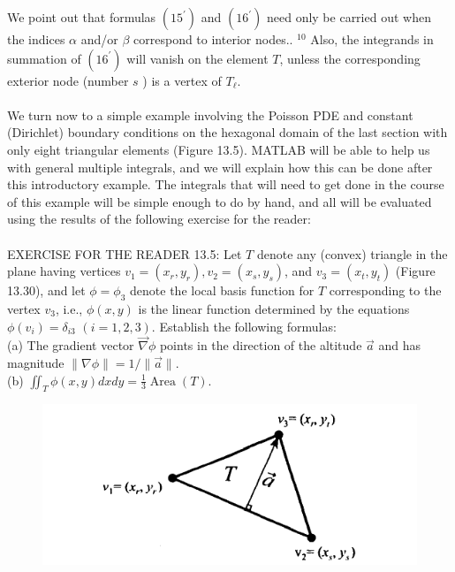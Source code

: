 \documentclass[../main.tex]{subfiles}
\begin{document}
We point out that formulas $\left(15^{\prime}\right)$ and $\left(16^{\prime}\right)$ need only be carried out when the indices $\alpha$ and/or $\beta$ correspond to interior nodes.. ${ }^{10}$ Also, the integrands in summation of $\left(16^{\prime}\right)$ will vanish on the element $T$, unless the corresponding exterior node (number $s$ ) is a vertex of $T_{\ell}$.
\\
\\
We turn now to a simple example involving the Poisson PDE and constant (Dirichlet) boundary conditions on the hexagonal domain of the last section with only eight triangular elements (Figure 13.5). MATLAB will be able to help us with general multiple integrals, and we will explain how this can be done after this introductory example. The integrals that will need to get done in the course of this example will be simple enough to do by hand, and all will be evaluated using the results of the following exercise for the reader:
\\
\\
EXERCISE FOR THE READER 13.5: Let $T$ denote any (convex) triangle in the plane having vertices $v_{1}=\left(x_{r}, y_{r}\right), v_{2}=\left(x_{s}, y_{s}\right)$, and $v_{3}=\left(x_{t}, y_{t}\right)$ (Figure 13.30), and let $\phi=\phi_{3}$ denote the local basis function for $T$ corresponding to the vertex $v_{3}$, i.e., $\phi(x, y)$ is the linear function determined by the equations $\phi\left(v_{i}\right)=\delta_{i 3}$ $(i=1,2,3)$. Establish the following formulas:
\\
(a) The gradient vector $\vec{\nabla} \phi$ points in the direction of the altitude $\vec{a}$ and has magnitude $\|\nabla \phi\|=1 /\|\vec{a}\|$.
\\
(b) $\iint_{T} \phi(x, y) d x d y=\frac{1}{3} \operatorname{Area}(T)$.
\begin{figure}[H]
\includegraphics[width=0.9\linewidth]{15}
	\centering
	\label{pfig:ch13_8}
\end{figure}
\end{document}
